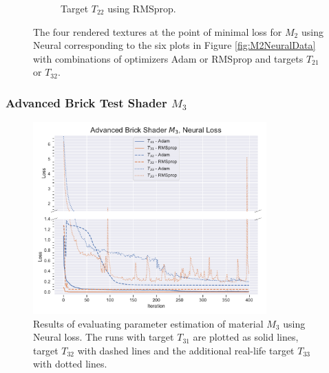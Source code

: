 \begin{figure}
\begin{subfigure}[t]{.25\textwidth}
    \caption{Target $T_{22}$ using RMSprop.}
    \label{fig:M2NeuralFinalRendersRandomRMSprop}
\end{subfigure}
\caption{The four rendered textures at the point of minimal loss for $M_2$ using Neural corresponding to the six plots in Figure \ref{fig:M2NeuralData} with combinations of optimizers Adam or RMSprop and targets $T_{21}$ or $T_{32}$.}
\label{fig:M2NeuralFinalRenders}
\end{figure}


\subsubsection{Advanced Brick Test Shader $M_3$}

\begin{figure}
    \centering
    \includegraphics[width=0.8\textwidth]{img/evaluation/M3/ABS_NEURAL.pdf}
    \caption{Results of evaluating parameter estimation of material $M_3$ using Neural loss. The runs with target $T_{31}$ are plotted as solid lines, target $T_{32}$ with dashed lines and the additional real-life target $T_{33}$ with dotted lines.}
    \label{fig:M3NeuralData}
\end{figure}

